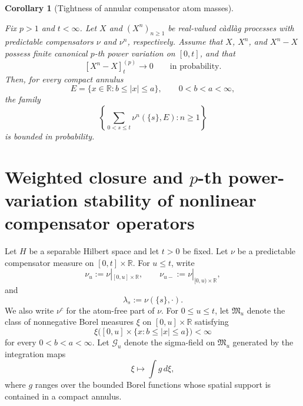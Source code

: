 \documentclass[a4paper,10pt]{article}
\newtheorem{defin}[thm]{Definition}
\newtheorem{corollary}[thm]{Corollary}
\begin{document}
\begin{corollary}[Tightness of annular compensator atom masses]
\label{cor:annular-compensator-atom-mass-tightness}

Fix \(p>1\) and \(t<\infty\). Let \(X\) and
\((X^n)_{n\ge1}\) be real-valued càdlàg processes with predictable
compensators \(\nu\) and \(\nu^n\), respectively. Assume that \(X\),
\(X^n\), and \(X^n-X\) possess finite canonical \(p\)-th power variation
on \([0,t]\), and that
\[
        [X^n-X]^{(p)}_t
        \longrightarrow0
        \qquad\text{in probability}.
\]
Then, for every compact annulus
\[
        E
        =
        \{x\in\mathbb R:b\le |x|\le a\},
        \qquad
        0<b<a<\infty,
\]
the family
\[
\left\{
        \sum_{0<s\le t}\nu^n(\{s\},E)
        :
        n\ge1
\right\}
\]
is bounded in probability.
\end{corollary}



\section{Weighted closure and \(p\)-th power-variation stability of nonlinear compensator operators}\label{sec:operators}

Let \(H\) be a separable Hilbert space and let \(t>0\) be fixed.  Let
\(\nu\) be a predictable compensator measure on \([0,t]\times\mathbb R\).
For \(u\le t\), write
\[
        \nu_u:=\nu|_{[0,u]\times\mathbb R},
        \qquad
        \nu_{u-}:=\nu|_{[0,u)\times\mathbb R},
\]
and
\[
        \lambda_s:=\nu(\{s\},\cdot).
\]
We also write \(\nu^c\) for the atom-free part of \(\nu\).
For \(0\le u\le t\), let \(\mathfrak M_u\) denote the class of
nonnegative Borel measures \(\xi\) on
\([0,u]\times\mathbb R\) satisfying
\[
\xi\bigl(
[0,u]\times\{x:b\le |x|\le a\}
\bigr)
<
\infty
\]
for every \(0<b<a<\infty\). Let \(\mathcal G_u\) denote the sigma-field
on \(\mathfrak M_u\) generated by the integration maps
\[
\xi\longmapsto\int g\,d\xi,
\]
where \(g\) ranges over the bounded Borel functions whose spatial
support is contained in a compact annulus.
\end{document}
